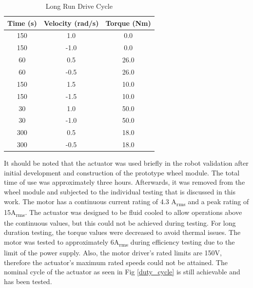 \begin{table}[h]
  \caption{Long Run Drive Cycle}
  \label{table_2}
  \begin{center}
    \begin{tabular}{|c||c||c|}
    \hline
    Time (s) & Velocity (rad/s) & Torque (Nm)\\
    \hline
    150 & 1.0 & 0.0\\
    \hline
    150 & -1.0 & 0.0\\
    \hline
    60 & 0.5 & 26.0\\
    \hline
    60 & -0.5 & 26.0\\
    \hline
    150 & 1.5 & 10.0\\
    \hline
    150 & -1.5 & 10.0\\
    \hline
    30 & 1.0 & 50.0\\
    \hline
    30 & -1.0 & 50.0\\
    \hline
    300 & 0.5 & 18.0\\
    \hline
    300 & -0.5 & 18.0\\
    \hline
    \end{tabular}
  \end{center}
\end{table}

It should be noted that the actuator was used briefly in the robot validation after initial development and construction of the prototype wheel module.
The total time of use was approximately three hours.
Afterwards, it was removed from the wheel module and subjected to the individual testing that is discussed in this work.
The motor has a continuous current rating of 4.3 A\textsubscript{rms} and a peak rating of 15A\textsubscript{rms}.
The actuator was designed to be fluid cooled to allow operations above the continuous values, but this could not be achieved during testing.
For long duration testing, the torque values were decreased to avoid thermal issues.
The motor was tested to approximately 6A\textsubscript{rms} during efficiency testing due to the limit of the power supply.
Also, the motor driver's rated limits are 150V, therefore the actuator's maximum rated speeds could not be attained.
The nominal cycle of the actuator as seen in Fig \ref{duty_cycle} is still achievable and has been tested.


